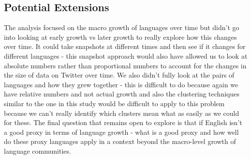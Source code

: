 \documentclass[12pt]{article}
\begin{document}
\subsection{Potential Extensions}
The analysis focused on the macro growth of languages over time but didn't go into looking at early growth vs later growth to really explore how this changes over time. It could take snapshots at different times and then see if it changes for different languages - this snapshot approach would also have allowed us to look at absolute numbers rather than proportional numbers to account for the changes in the size of data on Twitter over time. We also didn't fully look at the pairs of languages and how they grew together - this is difficult to do because again we have relative numbers and not actual growth and also the clustering techniques similar to the one in this study would be difficult to apply to this problem because we can't really identify which clusters mean what as easily as we could for these. The final question that remains open to explore is that if English isn't a good proxy in terms of language growth - what is a good proxy and how well do these proxy languages apply in a context beyond the macro-level growth of language communities.
\newpage
\end{document}
